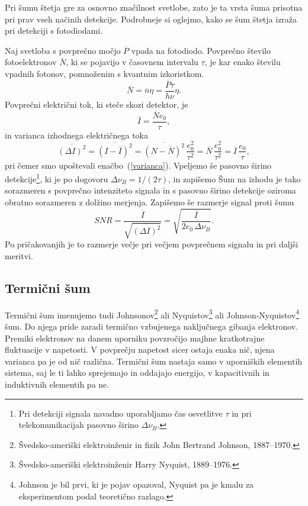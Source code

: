 Pri šumu štetja gre za osnovno značilnost svetlobe, zato je ta vrsta šuma
prisotna pri prav vseh načinih detekcije. Podrobneje si oglejmo, 
kako se šum štetja izraža pri detekciji s fotodiodami. 

Naj svetloba s povprečno močjo $\overline{P}$ vpada na fotodiodo.
Povprečno število fotoelektronov $\overline{N}$, ki se pojavijo v časovnem intervalu 
$\tau$, je kar enako številu vpadnih fotonov, pomnoženim 
s kvantnim izkoristkom. 
\begin{equation}
\overline{N} = \overline{n}\eta = \frac{\overline{P}\tau}{h \nu}\eta.
\end{equation}
Povprečni električni tok, ki steče skozi detektor, je  
\begin{equation}
\overline{I} = \frac{\overline{N} e_0}{\tau},
\end{equation}
in varianca izhodnega električnega toka 
\begin{equation}
\overline{(\Delta I)^2}=\overline{(I-\overline{I})^2} = \overline{(N-\overline{N})^2}\,
\frac{e_0^2}{\tau^2} = \overline{N}\,\frac{e_0^2}{\tau^2}= \overline{I}\,\frac{e_0}{\tau},
\end{equation}
pri čemer smo upoštevali enačbo~(\ref{varianca}). Vpeljemo še pasovno širino 
detekcije\footnote{Pri detekciji signala navadno uporabljamo
čas osvetlitve $\tau$ in pri telekomunikacijah pasovno širino $\Delta\nu_B$.}, ki je po 
dogovoru $\Delta\nu_B = 1/(2\tau)$,
in zapišemo
Šum na izhodu je tako sorazmeren s povprečno intenziteto signala in 
s pasovno širino detekcije oziroma obratno sorazmeren z dolžino 
merjenja. Zapišemo še razmerje signal proti šumu 
\begin{equation}
SNR = \frac{\overline{I}}{\sqrt{\overline{(\Delta I)^2}}}= \sqrt{\frac{\overline{I}}
{2 e_0\, \Delta\nu_B}}.
\label{SNRs}
\end{equation}
Po pričakovanjih je to razmerje večje pri večjem povprečnem signalu in pri daljši meritvi.

\subsection*{Termični šum} 
Termični šum 
imenujemo tudi Johnsonov\footnote{Švedsko-ameriški elektroinženir in fizik 
John Bertrand Johnson, 1887--1970.} ali Nyquistov\footnote{Švedsko-ameriški elektroinženir
Harry Nyquist, 1889--1976.} ali Johnson-Nyquistov\footnote{Johnson je bil prvi, 
ki je pojav opazoval, 
Nyquist pa je kmalu za eksperimentom podal teoretično razlago.} šum. 
Do njega pride zaradi termično vzbujenega naključnega gibanja elektronov. Premiki elektronov
na danem uporniku povzročijo majhne kratkotrajne 
fluktuacije v napetosti. V povprečju napetost sicer ostaja enaka nič, njena varianca pa je od 
nič različna. 
Termični šum nastaja samo v uporniških elementih sistema, saj le ti lahko
sprejemajo in oddajajo energijo, v kapacitivnih in induktivnih elementih pa ne.

